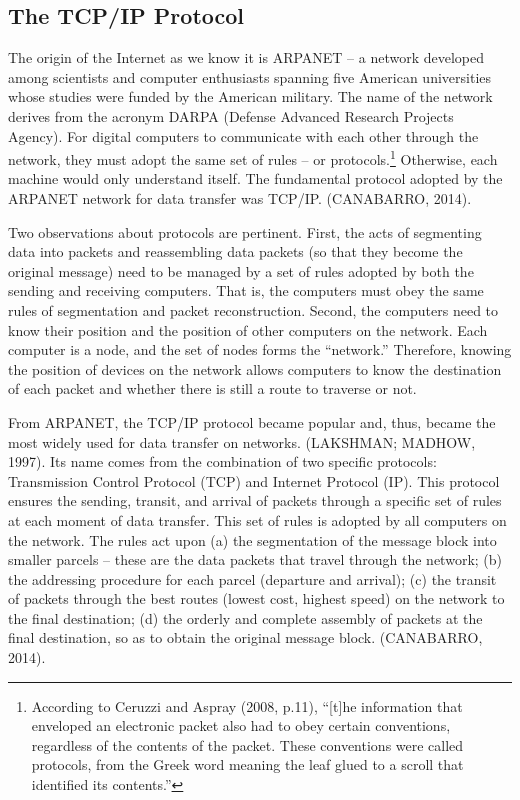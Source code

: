 \subsection{The TCP/IP Protocol}

The origin of the Internet as we know it is ARPANET -- a network developed among scientists and computer enthusiasts spanning five American universities whose studies were funded by the American military. The name of the network derives from the acronym DARPA (Defense Advanced Research Projects Agency). For digital computers to communicate with each other through the network, they must adopt the same set of rules -- or protocols.\footnote{According to Ceruzzi and Aspray (2008, p.11), ``{[}t{]}he information that enveloped an electronic packet also had to obey certain conventions, regardless of the contents of the packet. These conventions were called protocols, from the Greek word meaning the leaf glued to a scroll that identified its contents.''} Otherwise, each machine would only understand itself. The fundamental protocol adopted by the ARPANET network for data transfer was TCP/IP. (CANABARRO, 2014).

Two observations about protocols are pertinent. First, the acts of segmenting data into packets and reassembling data packets (so that they become the original message) need to be managed by a set of rules adopted by both the sending and receiving computers. That is, the computers must obey the same rules of segmentation and packet reconstruction. Second, the computers need to know their position and the position of other computers on the network. Each computer is a node, and the set of nodes forms the ``network.'' Therefore, knowing the position of devices on the network allows computers to know the destination of each packet and whether there is still a route to traverse or not.

From ARPANET, the TCP/IP protocol became popular and, thus, became the most widely used for data transfer on networks. (LAKSHMAN; MADHOW, 1997). Its name comes from the combination of two specific protocols: Transmission Control Protocol (TCP) and Internet Protocol (IP). This protocol ensures the sending, transit, and arrival of packets through a specific set of rules at each moment of data transfer. This set of rules is adopted by all computers on the network. The rules act upon (a) the segmentation of the message block into smaller parcels -- these are the data packets that travel through the network; (b) the addressing procedure for each parcel (departure and arrival); (c) the transit of packets through the best routes (lowest cost, highest speed) on the network to the final destination; (d) the orderly and complete assembly of packets at the final destination, so as to obtain the original message block. (CANABARRO, 2014).


